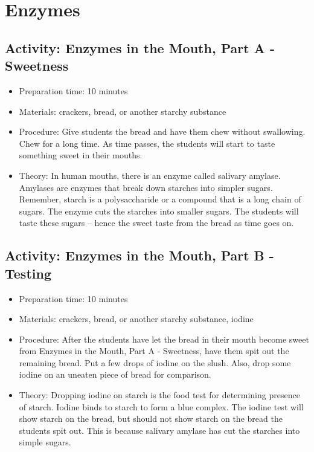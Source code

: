 \section{Enzymes}
\subsection{Activity: Enzymes in the Mouth, Part A - Sweetness}
\begin{itemize}
\item{Preparation time: 10 minutes}
\item{Materials: crackers, bread, or another starchy substance}
\item{Procedure: Give students the bread and have them chew without swallowing. Chew for a long time. As time passes, the students will start to taste something sweet in their mouths.}
\item{Theory: In human mouths, there is an enzyme called salivary amylase. Amylases are enzymes that break down starches into simpler sugars. Remember, starch is a polysaccharide or a compound that is a long chain of sugars. The enzyme cuts the starches into smaller sugars. The students will taste these sugars – hence the sweet taste from the bread as time goes on.}
\end{itemize}

\subsection{Activity: Enzymes in the Mouth, Part B - Testing}
\begin{itemize}
\item{Preparation time: 10 minutes}
\item{Materials: crackers, bread, or another starchy substance, iodine}
\item{Procedure: After the students have let the bread in their mouth become sweet from Enzymes in the Mouth, Part A - Sweetness, have them spit out the remaining bread. Put a few drops of iodine on the slush. Also, drop some iodine on an uneaten piece of bread for comparison.}
\item{Theory: Dropping iodine on starch is the food test for determining presence of starch. Iodine binds to starch to form a blue complex. The iodine test will show starch on the bread, but should not show starch on the bread the students spit out. This is because salivary amylase has cut the starches into simple sugars.}
\end{itemize}

